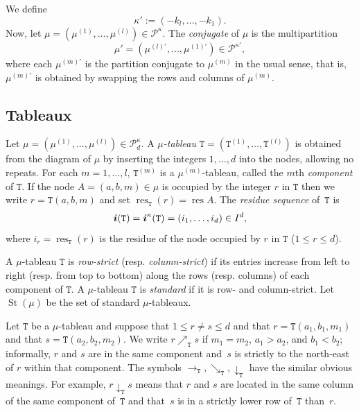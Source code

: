 \documentclass[twoside,11pt,reqno]{amsart}
\numberwithin{equation}{section}
\theoremstyle{definition}  %
\newcommand\Comment[2][\relax]{\space\par\medskip\noindent%
   \fbox{\begin{minipage}{\textwidth}\textbf{Comment\ifx\relax#1\else---#1\fi}\newline%
        #2\end{minipage}}\medskip
}
\def\bi{\text{\boldmath$i$}}
\newcommand{\res}{\operatorname{res}}
\newcommand{\St}{\operatorname{St}}
\newcommand{\0}{{\bar 0}}
\newcommand{\1}{{\bar 1}}
\newcommand\Par[1][]{{\mathscr P}^{\kappa#1}}
\def\T{{\mathtt T}}
\begin{document}
We define
\begin{equation}\label{EKappaPrime}
\kappa':=(-k_l,\dots,-k_1).
\end{equation}
Now, let $\mu=(\mu^{(1)},\dots,\mu^{(l)})\in\Par$. 
The {\em conjugate} of $\mu$ is the multipartition
$$\mu'=(\mu^{(l)'},\dots,\mu^{(1)'})\in \Par['],$$ 
where each $\mu^{(m)'}$ is the partition conjugate to $\mu^{(m)}$ in the usual sense, that is, $\mu^{(m)'}$ is obtained by swapping the rows and columns of $\mu^{(m)}$.  

\subsection{Tableaux}\label{SS:tableaux}
Let $\mu=(\mu^{(1)},\dots,\mu^{(l)})\in\Par_d$. 
A {\em $\mu$-tableau} 
$\T=(\T^{(1)},\dots,\T^{(l)})$ is obtained from the diagram of $\mu$ by 
inserting the integers $1,\dots,d$ into the nodes, allowing no repeats. 
For each $m=1,\dots,l$, $\T^{(m)}$ is a $\mu^{(m)}$-tableau, called the $m$th {\em component} of $\T$. 
If the node $A=(a,b,m)\in\mu$ is occupied by the integer $r$ in $\T$ then we write $r=\T(a,b,m)$ and set
$\res_\T(r)=\res A$. The {\em residue sequence} of~$\T$ is
\begin{equation}\label{EResSeq}
\bi(\T)=\bi^\kappa(\T)=(i_1,\dots,i_d)\in I^d,
\end{equation}
where $i_r=\res_\T(r)$ is the residue of the node occupied by 
$r$ in $\T$ ($1\leq r\leq d$). 


A $\mu$-tableau $\T$ is {\em row-strict} (resp. {\em column-strict}) if its entries increase from left to right (resp. from top to bottom) along the rows (resp. columns) of each component of $\T$. 
A $\mu$-tableau $\T$ is {\em standard} if it is row- and column-strict. 
 Let $\St(\mu)$ be the set of standard $\mu$-tableaux.  


Let $\T$ be a $\mu$-tableau and suppose that $1\leq r\neq s\leq d$ and that $r=\T(a_1,b_1,m_1)$ and that
$s=\T(a_2,b_2,m_2)$. We write $r\nearrow_\T s$ if $m_1=m_2$, $a_1>a_2$, and $b_1<b_2$; informally, $r$ and $s$
are in the same component and~$s$ is strictly to the north-east of $r$ within that component.  The symbols $\rightarrow_\T,\searrow_\T,\downarrow_\T$ have the  similar obvious meanings. For example,
$r\downarrow_\T s$ means that $r$ and $s$ are located in the same column of the same component of~$\T$ and
that~$s$ is in a strictly lower row of~$\T$ than~$r$. 
\end{document}
